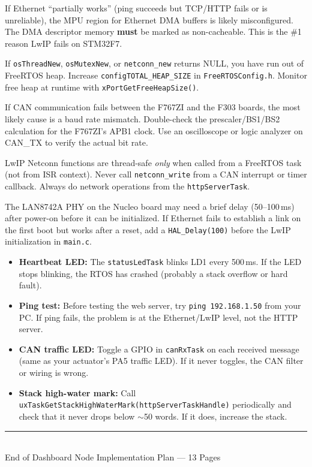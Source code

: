 \documentclass[11pt,a4paper]{article}
\begin{document}
\begin{warnbox}
If Ethernet ``partially works'' (ping succeeds but TCP/HTTP fails or is unreliable), the MPU region for Ethernet DMA buffers is likely misconfigured. The DMA descriptor memory \textbf{must} be marked as non-cacheable. This is the \#1 reason LwIP fails on STM32F7.
\end{warnbox}

\begin{warnbox}
If \texttt{osThreadNew}, \texttt{osMutexNew}, or \texttt{netconn\_new} returns NULL, you have run out of FreeRTOS heap. Increase \texttt{configTOTAL\_HEAP\_SIZE} in \texttt{FreeRTOSConfig.h}. Monitor free heap at runtime with \texttt{xPortGetFreeHeapSize()}.
\end{warnbox}

\begin{warnbox}
If CAN communication fails between the F767ZI and the F303 boards, the most likely cause is a baud rate mismatch. Double-check the prescaler/BS1/BS2 calculation for the F767ZI's APB1 clock. Use an oscilloscope or logic analyzer on CAN\_TX to verify the actual bit rate.
\end{warnbox}

\begin{warnbox}
LwIP Netconn functions are thread-safe \emph{only} when called from a FreeRTOS task (not from ISR context). Never call \texttt{netconn\_write} from a CAN interrupt or timer callback. Always do network operations from the \texttt{httpServerTask}.
\end{warnbox}

\begin{warnbox}
The LAN8742A PHY on the Nucleo board may need a brief delay (50--100\,ms) after power-on before it can be initialized. If Ethernet fails to establish a link on the first boot but works after a reset, add a \texttt{HAL\_Delay(100)} before the LwIP initialization in \texttt{main.c}.
\end{warnbox}

\begin{infobox}
\begin{itemize}
  \item \textbf{Heartbeat LED:} The \texttt{statusLedTask} blinks LD1 every 500\,ms. If the LED stops blinking, the RTOS has crashed (probably a stack overflow or hard fault).
  \item \textbf{Ping test:} Before testing the web server, try \texttt{ping 192.168.1.50} from your PC. If ping fails, the problem is at the Ethernet/LwIP level, not the HTTP server.
  \item \textbf{CAN traffic LED:} Toggle a GPIO in \texttt{canRxTask} on each received message (same as your actuator's PA5 traffic LED). If it never toggles, the CAN filter or wiring is wrong.
  \item \textbf{Stack high-water mark:} Call \texttt{uxTaskGetStackHighWaterMark(httpServerTaskHandle)} periodically and check that it never drops below $\sim$50 words. If it does, increase the stack.
\end{itemize}
\end{infobox}

\vfill
\begin{center}
\rule{0.6\textwidth}{0.4pt}\\[0.5em]
{\small End of Dashboard Node Implementation Plan --- 13 Pages}
\end{center}
\end{document}

